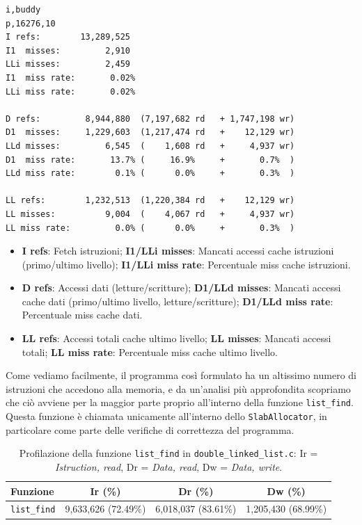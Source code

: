 \begin{lstlisting}
i,buddy
p,16276,10
I refs:        13,289,525
I1  misses:         2,910
LLi misses:         2,459
I1  miss rate:       0.02%
LLi miss rate:       0.02%

D refs:         8,944,880  (7,197,682 rd   + 1,747,198 wr)
D1  misses:     1,229,603  (1,217,474 rd   +    12,129 wr)
LLd misses:         6,545  (    1,608 rd   +     4,937 wr)
D1  miss rate:       13.7% (     16.9%     +       0.7%  )
LLd miss rate:        0.1% (      0.0%     +       0.3%  )

LL refs:        1,232,513  (1,220,384 rd   +    12,129 wr)
LL misses:          9,004  (    4,067 rd   +     4,937 wr)
LL miss rate:         0.0% (      0.0%     +       0.3%  )
\end{lstlisting}
\begin{itemize}
  \item \textbf{I refs}: Fetch istruzioni; \textbf{I1/LLi misses}: Mancati accessi cache istruzioni (primo/ultimo livello); \textbf{I1/LLi miss rate}: Percentuale miss cache istruzioni.
  \item \textbf{D refs}: Accessi dati (letture/scritture); \textbf{D1/LLd misses}: Mancati accessi cache dati (primo/ultimo livello, letture/scritture); \textbf{D1/LLd miss rate}: Percentuale miss cache dati.
  \item \textbf{LL refs}: Accessi totali cache ultimo livello; \textbf{LL misses}: Mancati accessi totali; \textbf{LL miss rate}: Percentuale miss cache ultimo livello.
\end{itemize}

Come vediamo facilmente, il programma così formulato ha un altissimo numero di istruzioni che accedono alla memoria, e da un'analisi più approfondita scopriamo che ciò avviene per la maggior parte proprio all'interno della funzione \texttt{list\_find}. Questa funzione è chiamata unicamente all'interno dello \texttt{SlabAllocator}, in particolare come parte delle verifiche di correttezza del programma. 

\begin{table}[H]
\centering
\begin{tabularx}{\textwidth}{|X|c|c|c|}
\hline
\textbf{Funzione} & \textbf{Ir (\%)} & \textbf{Dr (\%)} & \textbf{Dw (\%)} \\
\hline
\texttt{list\_find} & 9,633,626 (72.49\%) & 6,018,037 (83.61\%) & 1,205,430 (68.99\%) \\
\hline
\end{tabularx}
\caption{Profilazione della funzione \texttt{list\_find} in \texttt{double\_linked\_list.c}: Ir = \textit{Istruction, read}, Dr = \textit{Data, read}, Dw = \textit{Data, write}.}
\end{table}

